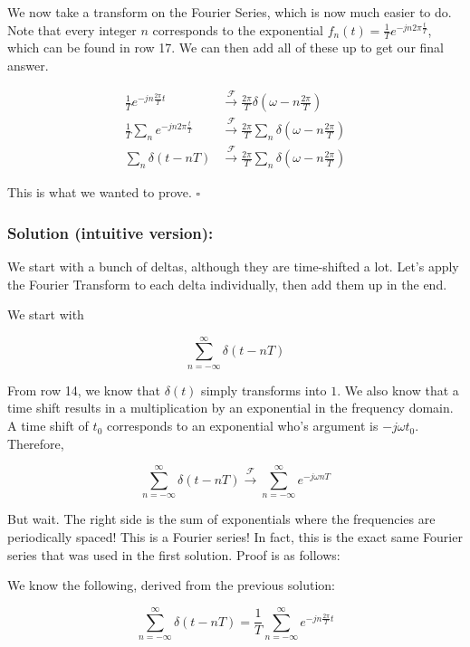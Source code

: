 \documentclass{article}
\begin{document}
We now take a transform on the Fourier Series, which is now much easier to do. Note that every integer $n$ corresponds to the exponential $f_n(t) = \frac{1}{T}e^{-jn2\pi\frac{t}{T}}$, which can be found in row 17. We can then add all of these up to get our final answer.

\begin{equation*}
\begin{split}
\frac{1}{T}e^{-jn\frac{2\pi}{T}t} & \xrightarrow{\mathcal{F}}  \frac{2\pi}{T}\delta(\omega - n\frac{2\pi}{T})\\
\frac{1}{T}\sum_n e^{-jn2\pi\frac{t}{T}}& \xrightarrow{\mathcal{F}} \frac{2\pi}{T}\sum_n\delta(\omega - n\frac{2\pi}{T})\\
\sum_{n} \delta(t-nT)& \xrightarrow{\mathcal{F}} \frac{2\pi}{T}\sum_n\delta(\omega - n\frac{2\pi}{T})
\end{split}
\end{equation*}

This is what we wanted to prove. $\square$

\vspace{1cm}

\subsubsection{Solution (intuitive version):}

We start with a bunch of deltas, although they are time-shifted a lot. Let's apply the Fourier Transform to each delta individually, then add them up in the end.

We start with

$$\sum_{n = -\infty}^{\infty} \delta(t - nT)$$

From row 14, we know that $\delta(t)$ simply transforms into $1$. We also know that a time shift results in a multiplication by an exponential in the frequency domain. A time shift of $t_0$ corresponds to an exponential who's argument is $-j \omega t_0$. Therefore,

$$\sum_{n = -\infty}^{\infty} \delta(t - nT) \xrightarrow{\mathcal{F}} \sum_{n = -\infty}^{\infty} e^{-j \omega nT}$$

But wait. The right side is the sum of exponentials where the frequencies are periodically spaced! This is a Fourier series! In fact, this is the exact same Fourier series that was used in the first solution. Proof is as follows:

We know the following, derived from the previous solution:

\[
\sum_{n = -\infty}^{\infty} \delta(t-nT) = \frac{1}{T}\sum_{n = -\infty}^{\infty}e^{-jn\frac{2\pi}{T}t}
\]
\end{document}
